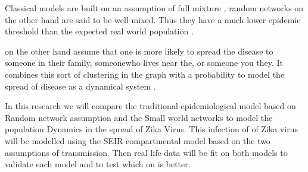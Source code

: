 Classical models are built on an assumption of full mixture , random networks on the other hand are said to be well mixed. Thus they have a much lower epidemic threshold than the expected real world population \citep{witten2007simulations}.
 
 on the other hand assume that one is more likely to spread the disease to someone in their family, someonewho lives near the, or someone you they. It combines this sort of clustering in the graph with a probability to model the spread of disease as a dynamical system \citep{newman2001random}.


In this research we will compare the traditional epidemiological model based on Random network assumption and the Small world networks to model the population Dynamics in the spread of Zika Virus. This infection of of Zika virus will be modelled using the SEIR compartmental model based on the two assumptions of transmission. Then real life data will be fit on both models to validate each model and to test which on is better.



